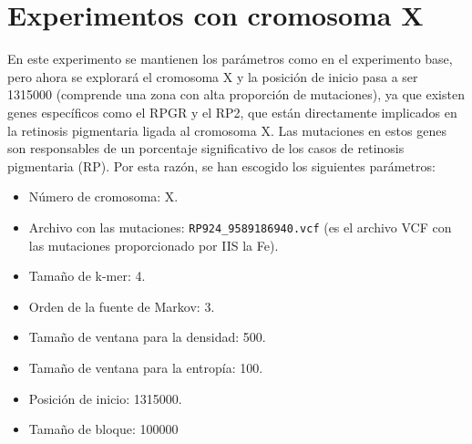 \documentclass[11pt,spanish,listoffigures,listoftables]{tfgetsinf}
\begin{document}
\section{Experimentos con cromosoma X}

En este experimento se mantienen los parámetros como en el experimento base, pero ahora se explorará el cromosoma X y la posición de inicio pasa a ser 1315000 (comprende una zona con alta proporción de mutaciones), ya que existen genes específicos como el RPGR y el RP2, que están directamente implicados en la retinosis pigmentaria ligada al cromosoma X. Las mutaciones en estos genes son responsables de un porcentaje significativo de los casos de retinosis pigmentaria (\acs{RP}). Por esta razón, se han escogido los siguientes parámetros:

\begin{itemize}
   \item Número de cromosoma: X.
   \item Archivo con las mutaciones: \texttt{RP924\_9589186940.vcf}  (es el archivo \acs{VCF} con las mutaciones proporcionado por \acs{IIS} la Fe).
   \item Tamaño de k-mer: 4.
   \item Orden de la fuente de Markov: 3.
   \item Tamaño de ventana para la densidad: 500.
   \item Tamaño de ventana para la entropía: 100.
   \item Posición de inicio: 1315000.
   \item Tamaño de bloque: 100000 
\end{itemize}
\end{document}

